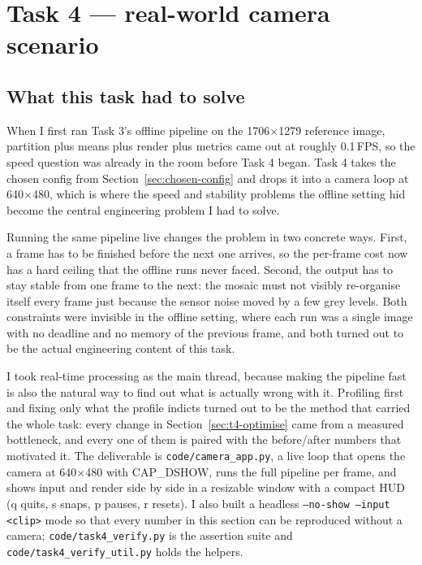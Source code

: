 \documentclass[11pt,a4paper]{article}
\begin{document}
\FloatBarrier
\FloatBarrier
\section{Task 4 --- real-world camera scenario}

\FloatBarrier
\FloatBarrier
\subsection{What this task had to solve}

When I first ran Task 3's offline pipeline on the 1706$\times$1279 reference
image, partition plus means plus render plus metrics came out at roughly
0.1\,FPS, so the speed question was already in the room before Task 4 began.
Task 4 takes the chosen config from Section~\ref{sec:chosen-config} and drops it
into a camera loop at 640$\times$480, which is where the speed and stability
problems the offline setting hid become the central engineering problem I had to
solve.

Running the same pipeline live changes the problem in two concrete ways. First,
a frame has to be finished before the next one arrives, so the per-frame cost
now has a hard ceiling that the offline runs never faced. Second, the output has
to stay stable from one frame to the next: the mosaic must not visibly
re-organise itself every frame just because the sensor noise moved by a few grey
levels. Both constraints were invisible in the offline setting, where each run
was a single image with no deadline and no memory of the previous frame, and
both turned out to be the actual engineering content of this task.

I took real-time processing as the main thread, because making the pipeline fast
is also the natural way to find out what is actually wrong with it. Profiling
first and fixing only what the profile indicts turned out to be the method that
carried the whole task: every change in Section~\ref{sec:t4-optimise} came from a
measured bottleneck, and every one of them is paired with the before/after
numbers that motivated it. The deliverable is \texttt{code/camera\_app.py}, a
live loop that opens the camera at 640$\times$480 with CAP\_DSHOW, runs the full
pipeline per frame, and shows input and render side by side in a resizable
window with a compact HUD (q quits, s snaps, p pauses, r resets). I also built a
headless \texttt{--no-show --input <clip>} mode so that every number in this
section can be reproduced without a camera; \texttt{code/task4\_verify.py} is
the assertion suite and \texttt{code/task4\_verify\_util.py} holds the helpers.
\end{document}
